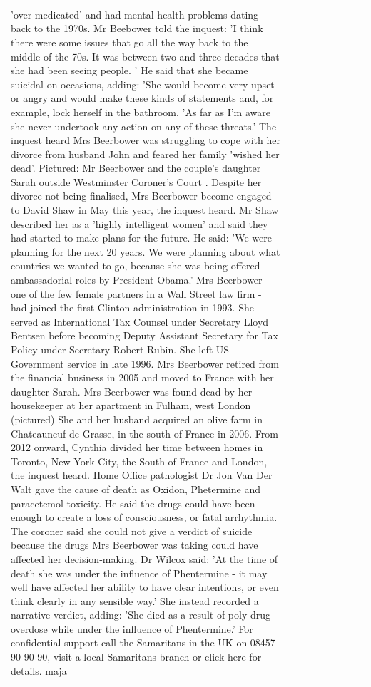 \begin{table}[H]
\begin{tabular}{lllrlllll}
'over-medicated' and had mental health problems dating back to the 1970s. Mr Beebower told the inquest: 'I think there were some issues that go all the way back to the middle of the 70s. It was between two and three decades that she had been seeing people. ' He said that she became suicidal on occasions, adding: 'She would become very upset or angry and would make these kinds of statements and, for example, lock herself in the bathroom. 'As far as I'm aware she never undertook any action on any of these threats.' The inquest heard Mrs Beerbower was struggling to cope with her divorce from husband John and feared her family 'wished her dead'. Pictured: Mr Beerbower and the couple's daughter Sarah outside Westminster Coroner's Court . Despite her divorce not being finalised, Mrs Beerbower become engaged to David Shaw in May this year, the inquest heard. Mr Shaw described her as a 'highly intelligent women' and said they had started to make plans for the future. He said: 'We were planning for the next 20 years. We were planning about what countries we wanted to go, because she was being offered ambassadorial roles by President Obama.' Mrs Beerbower - one of the few female partners in a Wall Street law firm - had joined the first Clinton administration in 1993. She served as International Tax Counsel under Secretary Lloyd Bentsen before becoming Deputy Assistant Secretary for Tax Policy under Secretary Robert Rubin. She left US Government service in late 1996. Mrs Beerbower retired from the financial business in 2005 and moved to France with her daughter Sarah. Mrs Beerbower was found dead by her housekeeper at her apartment in Fulham, west London (pictured) She and her husband acquired an olive farm in Chateauneuf de Grasse, in the south of France in 2006. From 2012 onward, Cynthia divided her time between homes in Toronto, New York City, the South of France and London, the inquest heard. Home Office pathologist Dr Jon Van Der Walt gave the cause of death as Oxidon, Phetermine and paracetemol toxicity. He said the drugs could have been enough to create a loss of consciousness, or fatal arrhythmia. The coroner said she could not give a verdict of suicide because the drugs Mrs Beerbower was taking could have affected her decision-making. Dr Wilcox said: 'At the time of death she was under the influence of Phentermine - it may well have affected her ability to have clear intentions, or even think clearly in any sensible way.' She instead recorded a narrative verdict, adding: 'She died as a result of poly-drug overdose while under the influence of Phentermine.' For confidential support call the Samaritans in the UK on 08457 90 90 90, visit a local Samaritans branch or click here for details. maja \\

\end{tabular}
\end{table}
